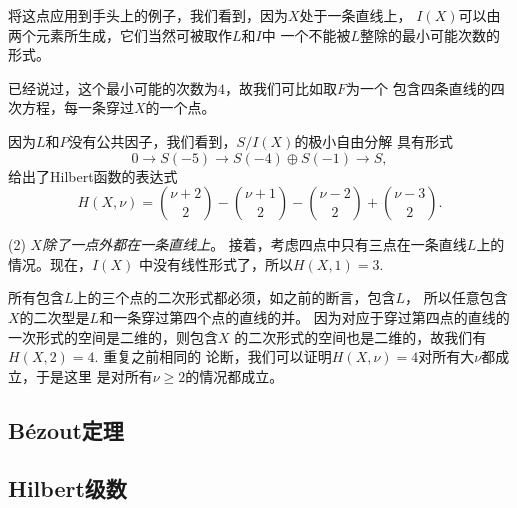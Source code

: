 将这点应用到手头上的例子，我们看到，因为$X$处于一条直线上，
$I(X)$可以由两个元素所生成，它们当然可被取作$L$和$I$中
一个不能被$L$整除的最小可能次数的形式。


已经说过，这个最小可能的次数为$4$，故我们可比如取$F$为一个
包含四条直线的四次方程，每一条穿过$X$的一个点。

因为$L$和$P$没有公共因子，我们看到，$S/I(X)$的极小自由分解
具有形式
\[
	0\longrightarrow S(-5)\longrightarrow S(-4)\oplus
	S(-1)\longrightarrow S,
\]
给出了Hilbert函数的表达式
\[
	H(X,\nu)=\binom{\nu+2}{2}-\binom{\nu+1}{2}
	-\binom{\nu-2}{2}+\binom{\nu-3}{2}.
\]

(2) \textit{$X$除了一点外都在一条直线上}。
接着，考虑四点中只有三点在一条直线$L$上的情况。现在，$I(X)$
中没有线性形式了，所以$H(X,1)=3$.


所有包含$L$上的三个点的二次形式都必须，如之前的断言，包含$L$，
所以任意包含$X$的二次型是$L$和一条穿过第四个点的直线的并。
因为对应于穿过第四点的直线的一次形式的空间是二维的，则包含$X$
的二次形式的空间也是二维的，故我们有$H(X,2)=4$. 重复之前相同的
论断，我们可以证明$H(X,\nu)=4$对所有大$\nu$都成立，于是这里
是对所有$\nu\geq 2$的情况都成立。


\subsection{B\'{e}zout定理}\label{s:3.3.5}

\subsection{Hilbert级数}\label{s:3.3.6}
